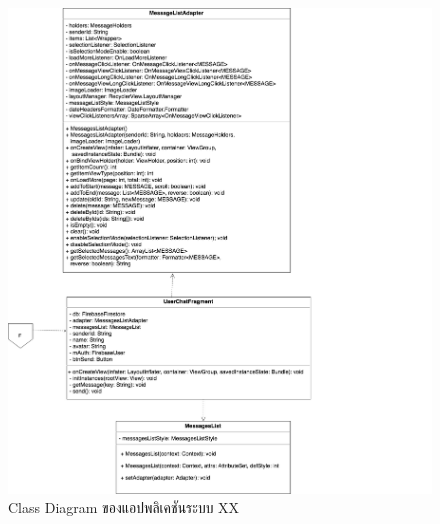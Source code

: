 	\begin{figure}[H]
		\includegraphics[width=1.0\columnwidth]{Figures/3/Class/UserChat}
		\caption{Class Diagram ของแอปพลิเคชันระบบ XX}
		\label{Fig:UserChatC}
	\end{figure}

